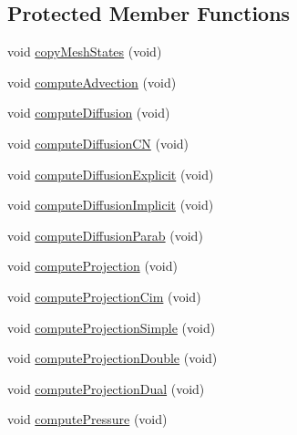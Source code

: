 \subsection*{Protected Member Functions}
\begin{DoxyCompactItemize}
\item 
void \hyperlink{class_incompress___solver___smooth__2_d___cartesian_ae8fc8cc18695a54ea08c06abb78ccffb}{copy\+Mesh\+States} (void)
\item 
void \hyperlink{class_incompress___solver___smooth__2_d___cartesian_a764338513859914f5b459429175d332d}{compute\+Advection} (void)
\item 
void \hyperlink{class_incompress___solver___smooth__2_d___cartesian_a92b48c87682ce91a0c80e2a9caec8ef7}{compute\+Diffusion} (void)
\item 
void \hyperlink{class_incompress___solver___smooth__2_d___cartesian_a828ffa88408358b731e5f92ba5b9f33d}{compute\+Diffusion\+CN} (void)
\item 
void \hyperlink{class_incompress___solver___smooth__2_d___cartesian_a15af4a808059dab10d804aabedc6bf9c}{compute\+Diffusion\+Explicit} (void)
\item 
void \hyperlink{class_incompress___solver___smooth__2_d___cartesian_a2339849ada21150c2774a500a2cf3652}{compute\+Diffusion\+Implicit} (void)
\item 
void \hyperlink{class_incompress___solver___smooth__2_d___cartesian_a9d34d7a902845486d3046d60281311d7}{compute\+Diffusion\+Parab} (void)
\item 
void \hyperlink{class_incompress___solver___smooth__2_d___cartesian_aaa83b8bca90e77629dc490820627a478}{compute\+Projection} (void)
\item 
void \hyperlink{class_incompress___solver___smooth__2_d___cartesian_a0d5f170e6db863440f6eb43ed7ec275b}{compute\+Projection\+Cim} (void)
\item 
void \hyperlink{class_incompress___solver___smooth__2_d___cartesian_aefb680abe4c07b6dabd757114320cfd5}{compute\+Projection\+Simple} (void)
\item 
void \hyperlink{class_incompress___solver___smooth__2_d___cartesian_a6a945df130db991958ff107865896c74}{compute\+Projection\+Double} (void)
\item 
void \hyperlink{class_incompress___solver___smooth__2_d___cartesian_a89ce423f5b6269f7564129d66e83e4db}{compute\+Projection\+Dual} (void)
\item 
void \hyperlink{class_incompress___solver___smooth__2_d___cartesian_a101e64b9d0a7df2f87229ccf093c91b2}{compute\+Pressure} (void)

\end{DoxyCompactItemize}
